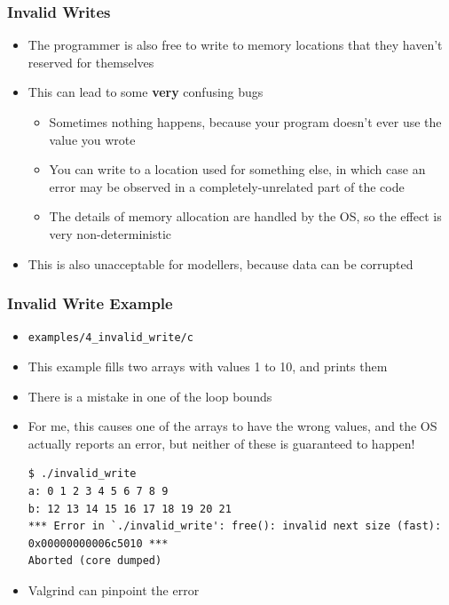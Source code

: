 \documentclass{beamer}
\begin{document}
\begin{frame}[fragile]
  \frametitle{Invalid Writes}
  \begin{itemize}
    \item The programmer is also free to write to memory locations that they haven't reserved for themselves
    \item This can lead to some {\bf very} confusing bugs
      \begin{itemize}
        \item Sometimes nothing happens, because your program doesn't ever use the value you wrote
          \item You can write to a location used for something else, in which case an error may be observed in a completely-unrelated part of the code
            \item The details of memory allocation are handled by the OS, so the effect is very non-deterministic
      \end{itemize}
      \item This is also unacceptable for modellers, because data can be corrupted
  \end{itemize}
\end{frame}

\begin{frame}[fragile]
  \frametitle{Invalid Write Example}
  \begin{itemize}
    \item \texttt{examples/4\_invalid\_write/c}
      \item This example fills two arrays with values 1 to 10, and prints them
        \item There is a mistake in one of the loop bounds
        \item For me, this causes one of the arrays to have the wrong values, and the OS actually reports an error, but neither of these is guaranteed to happen!
  \begin{lstlisting}
$ ./invalid_write
a: 0 1 2 3 4 5 6 7 8 9
b: 12 13 14 15 16 17 18 19 20 21
*** Error in `./invalid_write': free(): invalid next size (fast): 0x00000000006c5010 ***
Aborted (core dumped)
  \end{lstlisting}
  \item Valgrind can pinpoint the error
  \end{itemize}
\end{frame}
\end{document}
